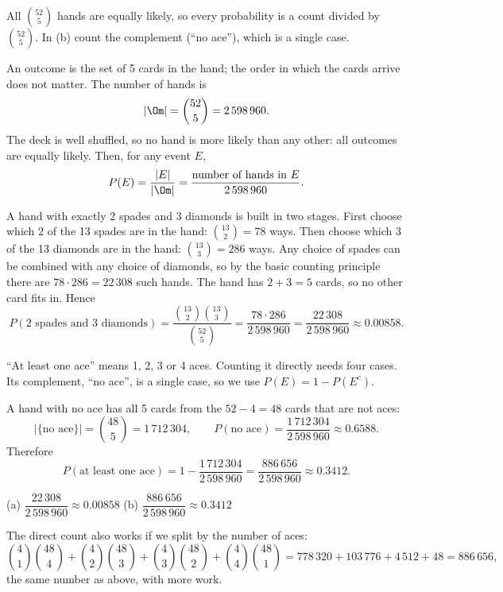 \begin{solution}
	\idea All $\binom{52}{5}$ hands are equally likely, so every probability is
	a count divided by $\binom{52}{5}$. In (b) count the complement (``no ace''),
	which is a single case.

	 An outcome is the set of 5 cards in the hand; the
	order in which the cards arrive does not matter. The number of hands is
	\[ |\Om|=\binom{52}{5}=2\,598\,960. \]
	The deck is well shuffled, so no hand is more likely than any other: all
	outcomes are equally likely. Then, for any event $E$,
	\[ P(E)=\frac{|E|}{|\Om|}=\frac{\text{number of hands in }E}{2\,598\,960}. \]

	 A hand with exactly 2 spades and 3 diamonds is built in two
	stages. First choose which 2 of the 13 spades are in the hand:
	$\binom{13}{2}=78$ ways. Then choose which 3 of the 13 diamonds are in the
	hand: $\binom{13}{3}=286$ ways. Any choice of spades can be combined with
	any choice of diamonds, so by the basic counting principle there are
	$78\cdot286=22\,308$ such hands. The hand has $2+3=5$ cards, so no other
	card fits in. Hence
	\[ P(\text{2 spades and 3 diamonds})
		=\frac{\binom{13}{2}\binom{13}{3}}{\binom{52}{5}}
		=\frac{78\cdot286}{2\,598\,960}=\frac{22\,308}{2\,598\,960}
		\approx0.00858. \]

	 ``At least one ace'' means 1, 2, 3 or 4 aces. Counting it
	directly needs four cases. Its complement, ``no ace'', is a single case, so
	we use $P(E)=1-P(E^c)$.

	A hand with no ace has all 5 cards from the $52-4=48$ cards that are not
	aces:
	\[ |\{\text{no ace}\}|=\binom{48}{5}=1\,712\,304,\qquad
		P(\text{no ace})=\frac{1\,712\,304}{2\,598\,960}\approx0.6588. \]
	Therefore
	\[ P(\text{at least one ace})=1-\frac{1\,712\,304}{2\,598\,960}
		=\frac{886\,656}{2\,598\,960}\approx0.3412. \]
	\begin{answer}
		(a) $\dfrac{22\,308}{2\,598\,960}\approx0.00858$ \quad
		(b) $\dfrac{886\,656}{2\,598\,960}\approx0.3412$
	\end{answer}
	\begin{remark}
		The direct count also works if we split by the number of aces:
		\[ \binom41\binom{48}{4}+\binom42\binom{48}{3}+\binom43\binom{48}{2}
			+\binom44\binom{48}{1}=778\,320+103\,776+4\,512+48=886\,656, \]
		the same number as above, with more work.
	\end{remark}
\end{solution}
